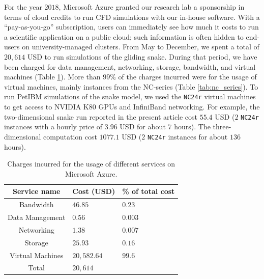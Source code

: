 \documentclass[10pt,journal,compsoc]{IEEEtran}
\begin{document}
For the year $2018$, Microsoft Azure granted our research lab a sponsorship in terms of cloud credits to run CFD simulations with our in-house software.
With a ``pay-as-you-go'' subscription, users can immediately see how much it costs to run a scientific application on a public cloud; such information is often hidden to end-users on university-managed clusters.
From May to December, we spent a total of $20,614$ USD to run simulations of the gliding snake.
During that period, we have been charged for data management, networking, storage, bandwidth, and virtual machines (Table \ref{tab:azure_charges}).
More than $99\%$ of the charges incurred were for the usage of virtual machines, mainly instances from the NC-series (Table \ref{tab:nc_series}).
To run PetIBM simulations of the snake model, we used the \texttt{NC24r} virtual machines to get access to NVIDIA K80 GPUs and InfiniBand networking.
For example, the two-dimensional snake run reported in the present article cost $55.4$ USD ($2$ \texttt{NC24r} instances with a hourly price of $3.96$ USD for about $7$ hours).
The three-dimensional computation cost $1077.1$ USD ($2$ \texttt{NC24r} instances for about $136$ hours).

\begin{table}
    \renewcommand{\arraystretch}{1.5}
    \caption{Charges incurred for the usage of different services on Microsoft Azure.}
    \label{tab:azure_charges}
    \centering
    \begin{tabular}{cll}
        Service name & Cost (USD) & \% of total cost \\
        \hline
        Bandwidth & $46.85$ & $0.23$ \\
        Data Management & $0.56$ & $0.003$ \\
        Networking & $1.38$ & $0.007$ \\
        Storage & $25.93$ & $0.16$ \\
        Virtual Machines & $20,582.64$& $99.6$ \\
        \hline
        Total & $20,614$ & \\
        \hline
    \end{tabular}
\end{table}
\end{document}
